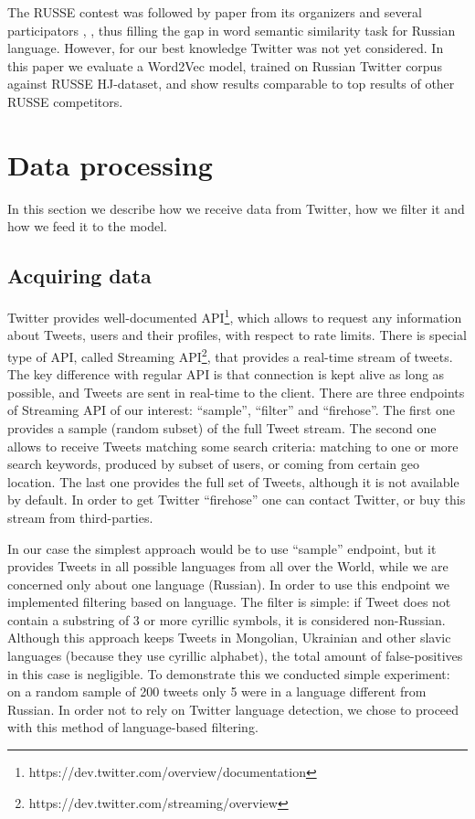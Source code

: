 \documentclass{llncs}
\begin{document}
The RUSSE contest was followed by paper from its organizers \cite{Panchenko2015} and several participators \cite{Arefyev}, \cite{Kutuzov}, thus filling the gap in word semantic similarity task for Russian language. However, for our best knowledge Twitter was not yet considered. In this paper we evaluate a Word2Vec model, trained on Russian Twitter corpus against RUSSE HJ-dataset, and show results comparable to top results of other RUSSE competitors.
%
\section{Data processing}
%
In this section we describe how we receive data from Twitter, how we filter it and how we feed it to the model.
%
\subsection{Acquiring data}
%
Twitter provides well-documented API\footnote{https://dev.twitter.com/overview/documentation}, which allows to request any information about Tweets, users and their profiles, with respect to rate limits. There is special type of API, called Streaming API\footnote{https://dev.twitter.com/streaming/overview}, that provides a real-time stream of tweets. The key difference with regular API is that connection is kept alive as long as possible, and Tweets are sent in real-time to the client. There are three endpoints of Streaming API of our interest: “sample”, “filter” and “firehose”. The first one provides a sample (random subset) of the full Tweet stream. The second one allows to receive Tweets matching some search criteria: matching to one or more search keywords, produced by subset of users, or coming from certain geo location. The last one provides the full set of Tweets, although it is not available by default. In order to get Twitter “firehose” one can contact Twitter, or buy this stream from third-parties.

In our case the simplest approach would be to use “sample” endpoint, but it provides Tweets in all possible languages from all over the World, while we are concerned only about one language (Russian). In order to use this endpoint we implemented filtering based on language. The filter is simple: if Tweet does not contain a substring of 3 or more cyrillic symbols, it is considered non-Russian. Although this approach keeps Tweets in Mongolian, Ukrainian and other slavic languages (because they use cyrillic alphabet), the total amount of false-positives in this case is negligible. To demonstrate this we conducted simple experiment: on a random sample of 200 tweets only 5 were in a language different from Russian. In order not to rely on Twitter language detection, we chose to proceed with this method of language-based filtering.
\end{document}
